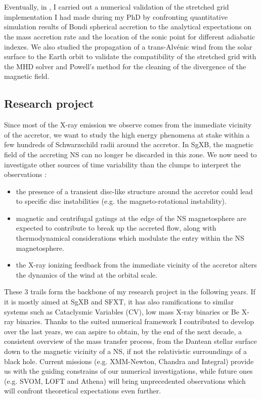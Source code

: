 \documentclass[a4paper,12pt,onecolumn]{article}
\makeatletter
\newcommand{\sgx}{SgXB\xspace}
\newcommand*{\eg}{e.g.\@\xspace}
\makeatother
\begin{document}
\phantom{m}\\ \\
\indent Eventually, in \cite{Xia2017}, I carried out a numerical validation of the stretched grid implementation I had made during my PhD by confronting quantitative simulation results of Bondi spherical accretion to the analytical expectations on the mass accretion rate and the location of the sonic point for different adiabatic indexes. We also studied the propagation of a trans-Alv\'enic wind from the solar surface to the Earth orbit to validate the compatibility of the stretched grid with the MHD solver and Powell's method for the cleaning of the divergence of the magnetic field.\\

\subsection*{Research project}

Since most of the X-ray emission we observe comes from the immediate vicinity of the accretor, we want to study the high energy phenomena at stake within a few hundreds of Schwarzschild radii around the accretor. In SgXB, the magnetic field of the accreting NS can no longer be discarded in this zone. We now need to investigate other sources of time variability than the clumps to interpret the observations :
\begin{itemize}
\item the presence of a transient disc-like structure around the accretor could lead to specific disc instabilities (\eg the magneto-rotational instability).
\item magnetic and centrifugal gatings at the edge of the NS magnetosphere are expected to contribute to break up the accreted flow, along with thermodynamical considerations which modulate the entry within the NS magnetosphere.
\item the X-ray ionizing feedback from the immediate vicinity of the accretor alters the dynamics of the wind at the orbital scale.
\end{itemize}
These 3 trails form the backbone of my research project in the following years. If it is mostly aimed at \sgx and SFXT, it has also ramifications to similar systems such as Cataclysmic Variables (CV), low mass X-ray binaries or Be X-ray binaries. Thanks to the suited numerical framework I contributed to develop over the last years, we can aspire to obtain, by the end of the next decade, a consistent overview of the mass transfer process, from the Dantean stellar surface down to the magnetic vicinity of a NS, if not the relativistic surroundings of a black hole. Current missions (\eg XMM-Newton, Chandra and Integral) provide us with the guiding constrains of our numerical investigations, while future ones (\eg SVOM, LOFT and Athena) will bring unprecedented observations which will confront theoretical expectations even further.
\end{document}
